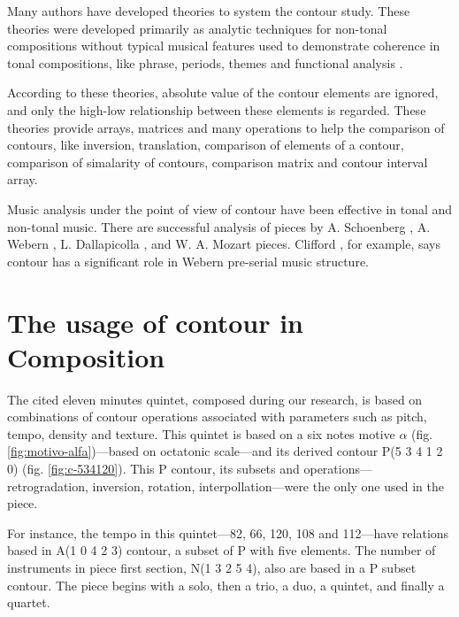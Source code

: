 Many authors
\cite{friedmann85:methodology,friedmann87:response,morris87:composition,morris93:directions,marvin.ea87:relating,marvin88:generalized,marvin.ea95:generalization,polansky.ea92:possible,quinn97:fuzzy,clifford95:contour,beard03:contour}
have developed theories to system the contour study. These theories
were developed primarily as analytic techniques for non-tonal
compositions without typical musical features used to demonstrate
coherence in tonal compositions, like phrase, periods, themes and
functional analysis \cite{beard03:contour}.

According to these theories, absolute value of the contour elements
are ignored, and only the high-low relationship between these elements
is regarded. These theories provide arrays, matrices and many
operations to help the comparison of contours, like inversion,
translation, comparison of elements of a contour, comparison of
simalarity of contours, comparison matrix and contour interval array.

Music analysis under the point of view of contour have been effective
in tonal and non-tonal music. There are successful analysis of pieces
by A. Schoenberg \cite{friedmann85:methodology}, A. Webern
\cite{clifford95:contour}, L. Dallapicolla
\cite{marvin88:generalized}, and W. A. Mozart \cite{beard03:contour}
pieces. Clifford \cite{clifford95:contour}, for example, says contour
has a significant role in Webern pre-serial music structure.

\section{The usage of contour in Composition}
\label{sec:contour-composition}

The cited eleven minutes quintet, composed during our research, is
based on combinations of contour operations associated with parameters
such as pitch, tempo, density and texture. This quintet is based on a
six notes motive $\alpha$ (fig. \ref{fig:motivo-alfa})---based on
octatonic scale---and its derived contour P(5 3 4 1 2 0)
(fig. \ref{fig:c-534120}). This P contour, its subsets and
operations---retrogradation, inversion, rotation,
interpollation---were the only one used in the piece.

For instance, the tempo in this quintet---82, 66, 120, 108 and
112---have relations based in A(1 0 4 2 3) contour, a subset of P with
five elements. The number of instruments in piece first section, N(1 3
2 5 4), also are based in a P subset contour. The piece begins with a
solo, then a trio, a duo, a quintet, and finally a quartet.

